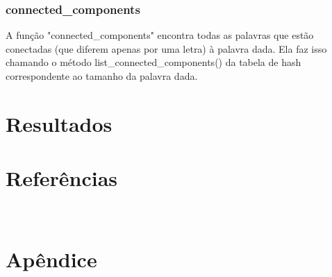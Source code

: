 \documentclass[a4paper,11pt]{article}
\begin{document}
    \subsubsection{connected\_components}
A função "connected\_components" encontra todas as palavras que estão conectadas (que diferem apenas por uma letra) à palavra dada. Ela faz isso chamando o método list\_connected\_components() da tabela de hash correspondente ao tamanho da palavra dada.
    
    \section{Resultados}\label{sec:resultados}

    \clearpage


    \section{Referências}\label{sec:referencias}~\nocite{aed,cpp}
    \printbibliography[
        heading=none,
    ]

    \clearpage


    \section{Apêndice}\label{sec:apendice}
    
\end{document}

